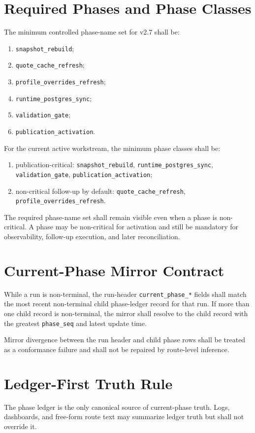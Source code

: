 \documentclass[11pt]{report}
\begin{document}
\section{Required Phases and Phase Classes}
The minimum controlled phase-name set for v2.7 shall be:
\begin{enumerate}[leftmargin=1.2cm]
    \item \texttt{snapshot\_rebuild};
    \item \texttt{quote\_cache\_refresh};
    \item \texttt{profile\_overrides\_refresh};
    \item \texttt{runtime\_postgres\_sync};
    \item \texttt{validation\_gate};
    \item \texttt{publication\_activation}.
\end{enumerate}

For the current active workstream, the minimum phase classes shall be:
\begin{enumerate}[leftmargin=1.2cm]
    \item publication-critical: \texttt{snapshot\_rebuild}, \texttt{runtime\_postgres\_sync}, \texttt{validation\_gate}, \texttt{publication\_activation};
    \item non-critical follow-up by default: \texttt{quote\_cache\_refresh}, \texttt{profile\_overrides\_refresh}.
\end{enumerate}

The required phase-name set shall remain visible even when a phase is non-critical. A phase may be non-critical for activation and still be mandatory for observability, follow-up execution, and later reconciliation.

\section{Current-Phase Mirror Contract}
While a run is non-terminal, the run-header \texttt{current\_phase\_*} fields shall match the most recent non-terminal child phase-ledger record for that run. If more than one child record is non-terminal, the mirror shall resolve to the child record with the greatest \texttt{phase\_seq} and latest update time.

Mirror divergence between the run header and child phase rows shall be treated as a conformance failure and shall not be repaired by route-level inference.

\section{Ledger-First Truth Rule}
The phase ledger is the only canonical source of current-phase truth. Logs, dashboards, and free-form route text may summarize ledger truth but shall not override it.
\end{document}
